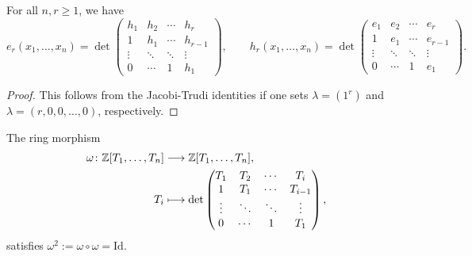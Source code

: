 \documentclass[11pt]{amsart}
\begin{document}
\begin{lem}\label{lem:e_nh_n}
    For all $n,r \geq 1$, we have 
    \begin{equation}
        e_r(x_1,\dots,x_n)=
        \det \begin{pmatrix}
        h_1 & h_2 & \cdots & h_r\\
        1 & h_1 & \cdots  & h_{r -1}\\
        \vdots & \ddots & \ddots & \vdots\\
        0 & \cdots & 1 & h_1
        \end{pmatrix}
        ,\qquad h_r (x_1,\dots,x_n) = \det\begin{pmatrix}
        e_1 & e_2 & \cdots & e_r\\
        1 & e_1 & \cdots  & e_{r -1}\\
        \vdots & \ddots & \ddots & \vdots\\
        0 & \cdots & 1 & e_1
        \end{pmatrix}.
    \end{equation}
\end{lem}

\begin{proof}
    This follows from the Jacobi-Trudi identities \cite[Eq.~(3.4)--(3.5)]{Mac15} if one sets $\lambda=(1^r)$ and $\lambda=(r, 0, 0, \dots, 0)$, respectively.
\end{proof}

\begin{cor}\label{cor:omega}
The ring morphism
\begin{align}
    \omega \colon \mathbb{Z} [T_1,\dots,T_n] &\longrightarrow \mathbb{Z}[T_1,\dots,T_n], \\
            T_i &\longmapsto     \det \begin{pmatrix}
        T_1 & T_2 & \cdots & T_i\\
        1 & T_1 & \cdots  & T_{i -1}\\
        \vdots & \ddots & \ddots & \vdots\\
        0 & \cdots & 1 & T_1
    \end{pmatrix}, \label{eq:omega}
\end{align}
satisfies \(\omega^2 := \omega \circ \omega = \mathrm{Id}\).
\end{cor}
\end{document}
